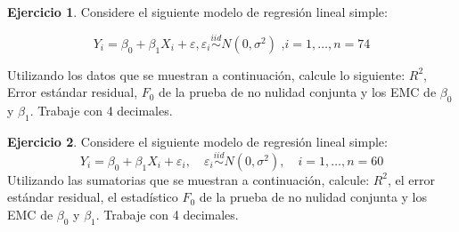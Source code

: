 \documentclass[
  11pt,
]{book}
\theoremstyle{definition}
\theoremstyle{definition}
\theoremstyle{definition}
\newtheorem{exercise}{Ejercicio}[chapter]
\theoremstyle{definition}
\theoremstyle{remark}
\begin{document}
\begin{exercise}
\leavevmode

\item

Considere el siguiente modelo de regresión lineal simple:

\[
Y_i = \beta_0 + \beta_1X_i + \varepsilon, \varepsilon_i \overset{iid}{\sim} N(0, \sigma^2) \text{ ,} i = 1, \ldots, n = 74
\]

Utilizando los datos que se muestran a continuación, calcule lo siguiente: \(R^2\), Error estándar residual, \(F_0\) de la prueba de no nulidad conjunta y los EMC de \(\beta_0\) y \(\beta_1\). Trabaje con 4 decimales.

\begin{table}[H]
\centering
{}
\end{table}

\end{exercise}

\begin{exercise}

Considere el siguiente modelo de regresión lineal simple:
\[
Y_i=\beta_0+\beta_1 X_i+\varepsilon_i,\quad \varepsilon_i\overset{iid}{\sim}N(0,\sigma^2),\quad i=1,\ldots,n=60
\]
Utilizando las sumatorias que se muestran a continuación, calcule: \(R^2\), el error estándar residual, el estadístico \(F_0\) de la prueba de no nulidad conjunta y los EMC de \(\beta_0\) y \(\beta_1\). Trabaje con 4 decimales.

\begin{table}[H]
\centering
{}
\end{table}

\end{exercise}
\end{document}
